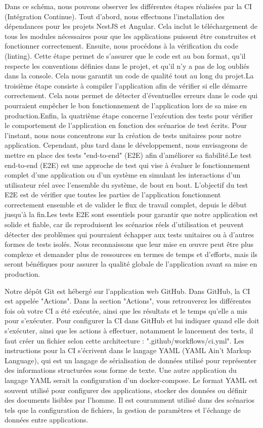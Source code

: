 \documentclass[12pt]{article}
\begin{document}
\justify
\text
Dans ce schéma, nous pouvons observer les différentes étapes réalisées par la CI (Intégration Continue). Tout d'abord, nous effectuons l'installation des dépendances pour les projets NestJS et Angular. Cela inclut le téléchargement de tous les modules nécessaires pour que les applications puissent être construites et fonctionner correctement. Ensuite, nous procédons à la vérification du code (linting). Cette étape permet de s'assurer que le code est au bon format, qu'il respecte les conventions définies dans le projet, et qu'il n'y a pas de log oubliés dans la console. Cela nous garantit un code de qualité tout au long du projet.La troisième étape consiste à compiler l'application afin de vérifier si elle démarre correctement. Cela nous permet de détecter d'éventuelles erreurs dans le code qui pourraient empêcher le bon fonctionnement de l'application lors de sa mise en production.Enfin, la quatrième étape concerne l'exécution des tests pour vérifier le comportement de l'application en fonction des scénarios de test écrits. Pour l'instant, nous nous concentrons sur la création de tests unitaires pour notre application. Cependant, plus tard dans le développement, nous envisageons de mettre en place des tests "end-to-end" (E2E) afin d'améliorer sa fiabilité.Le test end-to-end (E2E) est une approche de test qui vise à évaluer le fonctionnement complet d'une application ou d'un système en simulant les interactions d'un utilisateur réel avec l'ensemble du système, de bout en bout. L'objectif du test E2E est de vérifier que toutes les parties de l'application fonctionnent correctement ensemble et de valider le flux de travail complet, depuis le début jusqu'à la fin.Les tests E2E sont essentiels pour garantir que notre application est solide et fiable, car ils reproduisent les scénarios réels d'utilisation et peuvent détecter des problèmes qui pourraient échapper aux tests unitaires ou à d'autres formes de tests isolés. Nous reconnaissons que leur mise en œuvre peut être plus complexe et demander plus de ressources en termes de temps et d'efforts, mais ils seront bénéfiques pour assurer la qualité globale de l'application avant sa mise en production.

\justify
\text Notre dépôt Git est hébergé sur l'application web GitHub. Dans GitHub, la CI est appelée "Actions". Dans la section "Actions", vous retrouverez les différentes fois où votre CI a été exécutée, ainsi que les résultats et le temps qu'elle a mis pour s'exécuter. Pour configurer la CI dans GitHub et lui indiquer quand elle doit s'exécuter, ainsi que les actions à effectuer, notamment le lancement des tests, il faut créer un fichier selon cette architecture : ".github/workflows/ci.yml". Les instructions pour la CI s'écrivent dans le langage YAML (YAML Ain't Markup Language), qui est un langage de sérialisation de données utilisé pour représenter des informations structurées sous forme de texte. Une autre application du langage YAML serait la configuration d'un docker-compose. Le format YAML est souvent utilisé pour configurer des applications, stocker des données ou définir des documents lisibles par l'homme. Il est couramment utilisé dans des scénarios tels que la configuration de fichiers, la gestion de paramètres et l'échange de données entre applications.
\end{document}
